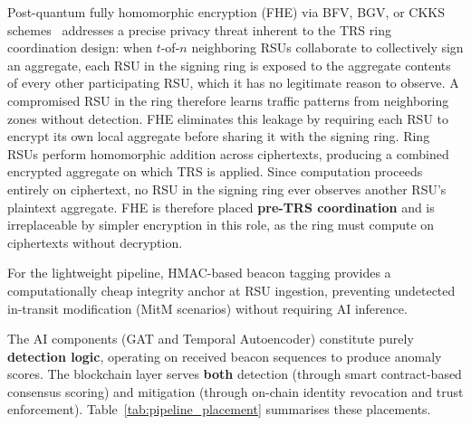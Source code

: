 \documentclass[12pt, a4paper]{report}
\begin{document}
Post-quantum fully homomorphic encryption (FHE) via BFV, BGV, or CKKS
schemes~\cite{mamun2025postquantum} addresses a precise privacy threat inherent
to the TRS ring coordination design: when $t$-of-$n$ neighboring RSUs
collaborate to collectively sign an aggregate, each RSU in the signing ring
is exposed to the aggregate contents of every other participating RSU, which
it has no legitimate reason to observe. A compromised RSU in the ring therefore
learns traffic patterns from neighboring zones without detection. FHE eliminates
this leakage by requiring each RSU to encrypt its own local aggregate before
sharing it with the signing ring. Ring RSUs perform homomorphic addition across
ciphertexts, producing a combined encrypted aggregate on which TRS is applied.
Since computation proceeds entirely on ciphertext, no RSU in the signing ring
ever observes another RSU's plaintext aggregate. FHE is therefore placed
\textbf{pre-TRS coordination} and is irreplaceable by simpler encryption in
this role, as the ring must compute on ciphertexts without decryption.

For the lightweight pipeline, HMAC-based beacon tagging provides a
computationally cheap integrity anchor at RSU ingestion, preventing
undetected in-transit modification (MitM scenarios) without requiring
AI inference.

The AI components (GAT and Temporal Autoencoder) constitute purely
\textbf{detection logic}, operating on received beacon sequences to
produce anomaly scores. The blockchain layer serves \textbf{both}
detection (through smart contract-based consensus scoring) and mitigation
(through on-chain identity revocation and trust enforcement).
Table~\ref{tab:pipeline_placement} summarises these placements.
\end{document}
